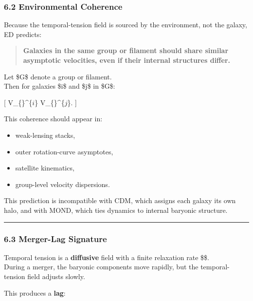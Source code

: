 \subsubsection{6.2 Environmental
Coherence}\label{environmental-coherence-1}

Because the temporal-tension field is sourced by the environment, not
the galaxy, ED predicts:

\begin{quote}
\textbf{Galaxies in the same group or filament should share similar
asymptotic velocities, even if their internal structures differ.}
\end{quote}

Let \$G\$ denote a group or filament.\\
Then for galaxies \$i\$ and \$j\$ in \$G\$:

{[} V\_\{\infty\}\^{}\{\(i\)\} \approx V\_\{\infty\}\^{}\{\(j\)\}.
 {]}

This coherence should appear in:

\begin{itemize}
\tightlist
\item
  weak-lensing stacks,\\
\item
  outer rotation-curve asymptotes,\\
\item
  satellite kinematics,\\
\item
  group-level velocity dispersions.
\end{itemize}

This prediction is incompatible with CDM, which assigns each galaxy its
own halo, and with MOND, which ties dynamics to internal baryonic
structure.

\begin{center}\rule{0.5\linewidth}{0.5pt}\end{center}

\subsubsection{6.3 Merger-Lag Signature}\label{merger-lag-signature}

Temporal tension is a \textbf{diffusive} field with a finite relaxation
rate \$\chi\$.\\
During a merger, the baryonic components move rapidly, but the
temporal-tension field adjusts slowly.

This produces a \textbf{lag}:

